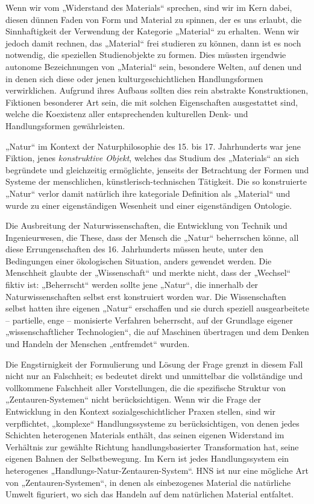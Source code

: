 \documentclass[11pt,a4paper]{article}
\begin{document}
Wenn wir vom „Widerstand des Materials“ sprechen, sind wir im Kern dabei,
diesen dünnen Faden von Form und Material zu spinnen, der es uns erlaubt, die
Sinnhaftigkeit der Verwendung der Kategorie „Material“ zu erhalten. Wenn wir
jedoch damit rechnen, das „Material“ frei studieren zu können, dann ist es
noch notwendig, die speziellen Studienobjekte zu formen.  Dies müssten
irgendwie autonome Bezeichnungen von „Material“ sein, besondere Welten, auf
denen und in denen sich diese oder jenen kulturgeschichtlichen Handlungsformen
verwirklichen.  Aufgrund ihres Aufbaus sollten dies rein abstrakte
Konstruktionen, Fiktionen besonderer Art sein, die mit solchen Eigenschaften
ausgestattet sind, welche die Koexistenz aller entsprechenden kulturellen
Denk- und Handlungsformen gewährleisten. 

„Natur“ im Kontext der Naturphilosophie des 15. bis 17. Jahrhunderts war jene
Fiktion, jenes \emph{konstruktive Objekt}, welches das Studium des „Materials“
an sich begründete und gleichzeitig ermöglichte, jenseits der Betrachtung der
Formen und Systeme der menschlichen, künstlerisch-technischen Tätigkeit. Die
so konstruierte „Natur“ verlor damit natürlich ihre kategoriale Definition als
„Material“ und wurde zu einer eigenständigen Wesenheit und einer
eigenständigen Ontologie.

Die Ausbreitung der Naturwissenschaften, die Entwicklung von Technik und
Ingenieurwesen, die These, dass der Mensch die „Natur“ beherrschen könne, all
diese Errungenschaften des 16. Jahrhunderts müssen heute, unter den
Bedingungen einer ökologischen Situation, anders gewendet werden.  Die
Menschheit glaubte der „Wissenschaft“ und merkte nicht, dass der „Wechsel“
fiktiv ist: „Beherrscht“ werden sollte jene „Natur“, die innerhalb der
Naturwissenschaften selbst erst konstruiert worden war. Die Wissenschaften
selbst hatten ihre eigenen „Natur“ erschaffen und sie durch speziell
ausgearbeitete -- partielle, enge -- monisierte Verfahren beherrscht, auf der
Grundlage eigener „wissenschaftlicher Technologien“, die auf Maschinen
übertragen und dem Denken und Handeln der Menschen „entfremdet“ wurden.

Die Engstirnigkeit der Formulierung und Lösung der Frage grenzt in diesem Fall
nicht nur an Falschheit; es bedeutet direkt und unmittelbar die vollständige
und vollkommene Falschheit aller Vorstellungen, die die spezifische Struktur
von „Zentauren-Systemen“ nicht berücksichti\-gen.  Wenn wir die Frage der
Entwicklung in den Kontext sozialgeschichtlicher Praxen stellen, sind wir
verpflichtet, „komplexe“ Handlungssysteme zu berücksichtigen, von denen jedes
Schichten heterogenen Materials enthält, das seinen eigenen Widerstand im
Verhältnis zur gewählte Richtung handlungsbasierter Transformation hat, seine
eigenen Bahnen der Selbstbewegung. Im Kern ist jedes Handlungssystem ein
heterogenes „Handlungs-Natur-Zentauren-System“.  HNS ist nur eine mögliche Art
von „Zentauren-Systemen“, in denen als einbezogenes Material die natürliche
Umwelt figuriert, wo sich das Handeln auf dem natürlichen Material entfaltet.
\end{document}
